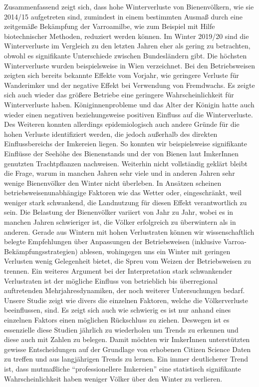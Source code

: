 Zusammenfassend zeigt sich, dass hohe Winterverluste von Bienenvölkern, wie sie 2014/15 aufgetreten sind, zumindest in einem bestimmten Ausmaß durch eine zeitgemäße Bekämpfung der Varroamilbe, wie zum Beispiel mit Hilfe biotechnischer Methoden, reduziert werden können.
\newline
Im Winter 2019/20 sind die Winterverluste im Vergleich zu den letzten Jahren eher als gering zu betrachten, obwohl es signifikante Unterschiede zwischen Bundesländern gibt. Die höchsten Winterverluste wurden beispielsweise in Wien verzeichnet. Bei den Betriebsweisen zeigten sich bereits bekannte Effekte vom Vorjahr, wie geringere Verluste für Wanderimker und der negative Effekt bei Verwendung von Fremdwachs. Es zeigte sich auch wieder das größere Betriebe eine geringere Wahrscheinlichkeit für Winterverluste haben.
\newline
Königinnenprobleme und das Alter der Königin hatte auch wieder einen negativen beziehungsweise positiven Einfluss auf die Winterverluste. Des Weiteren konnten allerdings epidemiologisch auch andere Gründe für die hohen Verluste identifiziert werden, die jedoch außerhalb des direkten Einflussbereichs der Imkereien liegen. So konnten wir beispielsweise signifikante Einflüsse der Seehöhe des Bienenstands und der von Bienen laut ImkerInnen genutzten Trachtpflanzen nachweisen.
\newline
Weiterhin nicht vollständig geklärt bleibt die Frage, warum in manchen Jahren sehr viele und in anderen Jahren sehr wenige Bienenvölker den Winter nicht überleben. In Ansätzen scheinen betriebsweisenunabhängige Faktoren wie das Wetter \citep{switanek2017} oder, eingeschränkt, weil weniger stark schwankend, die Landnutzung \citep{kuchling2018} für diesen Effekt verantwortlich zu sein.
\newline
Die Belastung der Bienenvölker variiert von Jahr zu Jahr, wobei es in manchen Jahren schwieriger ist, die Völker erfolgreich zu überwintern als in anderen. Gerade aus Wintern mit hohen Verlustraten können wir wissenschaftlich belegte Empfehlungen über Anpassungen der Betriebsweisen (inklusive Varroa-Bekämpfungsstrategien) ablesen, wohingegen uns ein Winter mit geringen Verlusten wenig Gelegenheit bietet, die Spreu vom Weizen der Betriebsweisen zu trennen. Ein weiteres Argument bei der Interpretation stark schwankender Verlustraten ist der mögliche Einfluss von betrieblich bis überregional auftretenden Mehrjahresdynamiken, der noch weiterer Untersuchungen bedarf.
\newline
Unsere Studie zeigt wie divers die einzelnen Faktoren, welche die Völkerverluste beeinflussen, sind. Es zeigt sich auch wie schwierig es ist nur anhand eines einzelnen Faktors einen möglichen Rückschluss zu ziehen. Deswegen ist es essenzielle diese Studien jährlich zu wiederholen um Trends zu erkennen und diese auch mit Zahlen zu belegen. Damit möchten wir ImkerInnen unterstützten gewisse Entscheidungen auf der Grundlage von erhobenen Citizen Science Daten zu treffen und aus langjährigen Trends zu lernen. Ein immer deutlicherer Trend ist, dass mutmaßliche \enquote{professionellere Imkereien} eine statistisch signifikante Wahrscheinlichkeit haben weniger Völker über den Winter zu verlieren.